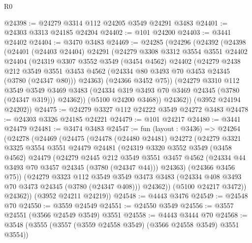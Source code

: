 \begin{lexlean}{R0}
\begin{coremodule}
@24398 := @24279 @3314 @112 @24205 @3549 @24291 @3483
@24401 := @24303 @3313 @24185 @24204
@24402 := @101 @24200
@24403 := @3441 @24402
@24404 := @3470 @3483
@24469 := @24285
    (@24296
      (@24392
        (@24398
          (@24401
            (@24403 @24404)
            @24291
            (@24279
              @3308
              @3312
              @3554
              @3551
              @24402
              @24404
              (@24319
                @3307
                @3552
                @3549
                (@3454 @4562)
                @24402
                (@24279
                  @2438
                  @212
                  @3549
                  @3551
                  @3453
                  @4562
                  (@24334 @80 @3493 @70 @3453 @24345 (@3780 (@24347 @80)))
                  @24363)
                (@24366 @3452 @75))
              (@24279
                @3310
                @112
                @3549
                @3549
                @3469
                @3483
                (@24334 @319 @3493 @70 @3469 @24345 (@3780 (@24347 @319)))
                @24362))
            (@5100 @24200 @3468))
          @24362))
      (@3952 @24194 @24202))
@24475 := @24279 @3327 @112 @24222 @3549 @24272 @3483
@24478 := @24303 @3326 @24185 @24221
@24479 := @101 @24217
@24480 := @3441 @24479
@24481 := @3474 @3483
@24547 := fun (layout : @3436) =>
  @24264
    (@24278
      (@24469
        (@24475
          (@24478
            (@24480 @24481)
            @24272
            (@24279
              @3321
              @3325
              @3554
              @3551
              @24479
              @24481
              (@24319
                @3320
                @3552
                @3549
                (@3458 @4562)
                @24479
                (@24279
                  @2445
                  @212
                  @3549
                  @3551
                  @3457
                  @4562
                  (@24334 @44 @3493 @70 @3457 @24345 (@3780 (@24347 @44)))
                  @24363)
                (@24366 @3456 @75))
              (@24279
                @3323
                @112
                @3549
                @3549
                @3473
                @3483
                (@24334 @408 @3493 @70 @3473 @24345 (@3780 (@24347 @408)))
                @24362))
            (@5100 @24217 @3472))
          @24362))
      (@3952 @24211 @24219))
@24548 := @4443 @3476
@24549 := @24548 @70
@24550 := @3559 @24549
@24551 := @24550 @3549
@24556 := @3557 @24551 (@3566 @24549 @3549) @3551
@24558 := @4443 @3444 @70
@24568 := @3548 (@3555 (@3557 (@3559 @24558 @3549) (@3566 @24558 @3549) @3551 @3554))

\end{coremodule}
\end{lexlean}
